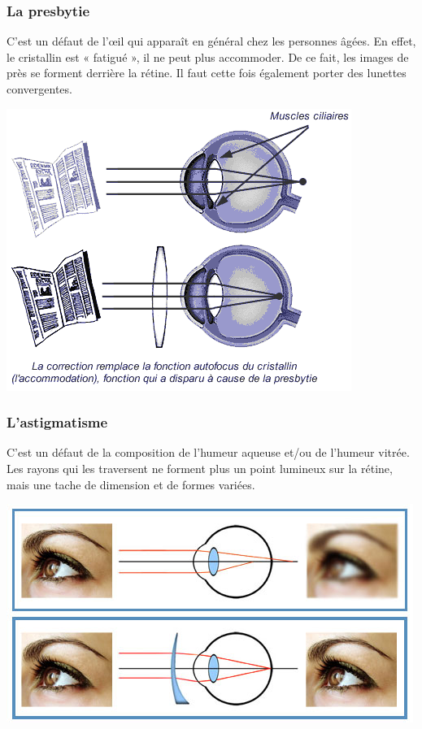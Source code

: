 \documentclass[a4paper, 12pt, onecolumn, openany]{report}
\begin{document}
	\subsubsection{La presbytie}
	C’est un défaut de l’œil qui apparaît en général chez les personnes âgées. En effet, le cristallin est « fatigué », il ne peut plus accommoder. De ce fait, les images de près se forment derrière la rétine. Il faut cette fois également porter des lunettes convergentes.
	
	\includegraphics[scale=0.7]{presbytie.png}
	
	\subsubsection{L'astigmatisme}
	C’est un défaut de la composition de l’humeur aqueuse et/ou de l’humeur vitrée. Les rayons qui les traversent ne forment plus un point lumineux sur la rétine, mais une tache de dimension et de formes variées.
	
	\includegraphics[scale=0.5]{astigmatisme3.jpg}
	
\end{document}
